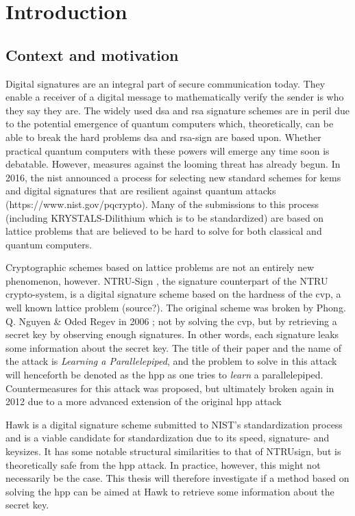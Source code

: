 \chapter{Introduction}
\section{Context and motivation}
Digital signatures are an integral part of secure communication today. They enable a receiver of a digital message to mathematically verify the sender is who they say they are. 
The widely used \gls{dsa} and \gls{rsa} 
signature schemes are in peril due to the potential emergence of quantum computers which, 
theoretically, can be able to break the hard problems \gls{dsa} and \gls{rsa}-sign are based upon.
Whether practical quantum computers with these powers will emerge any time soon is debatable. However, measures against the looming threat has already begun. 
In 2016, the \gls{nist} announced a process for selecting new standard schemes for \gls{kems} and 
digital signatures that are resilient against quantum attacks (https://www.nist.gov/pqcrypto). Many of the submissions to this process (including KRYSTALS-Dilithium which is to be standardized) 
are based on lattice problems that are believed to be hard to solve for both classical and quantum computers.

Cryptographic schemes based on lattice problems are not an entirely new phenomenon, however. NTRU-Sign \cite{NTRUSign03}, the signature counterpart of the NTRU crypto-system,
is a digital signature scheme based on the hardness of the \gls{cvp}, a well known lattice problem (source?).
The original scheme was broken by Phong. Q. Nguyen \& Oded Regev in 2006 \cite{NR09}; not by solving the \gls{cvp}, but by retrieving a secret key by observing enough signatures.
In other words, each signature leaks some information about the secret key.
The title of their paper and the name of the attack is \textit{Learning a Parallelepiped}, and the problem to solve in this attack will henceforth be denoted as the \gls{hpp} as one tries to \textit{learn} a parallelepiped.
Countermeasures for this attack was proposed, but ultimately broken again in 2012 due to a more advanced extension of the original \gls{hpp} attack \cite{Zonotope12}

Hawk \cite{HawkSpec24} is a digital signature scheme submitted to NIST's standardization process and is a viable candidate for standardization
due to its speed, signature- and keysizes. It has some notable structural similarities to that of NTRUsign, but is theoretically safe from the \gls{hpp} attack.
In practice, however, this might not necessarily be the case. This thesis will therefore investigate if a method based on solving the \gls{hpp} can be aimed at
Hawk to retrieve some information about the secret key.

